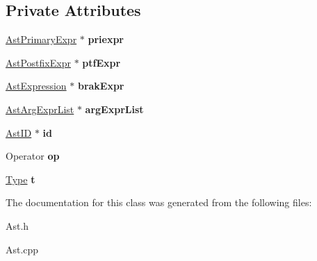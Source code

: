 \subsection*{Private Attributes}
\begin{DoxyCompactItemize}
\item 
\hypertarget{classAstPostfixExpr_a48162e70f9ec77d6aab3f036108cb69c}{\hyperlink{classAstPrimaryExpr}{Ast\-Primary\-Expr} $\ast$ {\bfseries priexpr}}\label{classAstPostfixExpr_a48162e70f9ec77d6aab3f036108cb69c}

\item 
\hypertarget{classAstPostfixExpr_ab66f24ef993fdad57b201fdb13dc9dc7}{\hyperlink{classAstPostfixExpr}{Ast\-Postfix\-Expr} $\ast$ {\bfseries ptf\-Expr}}\label{classAstPostfixExpr_ab66f24ef993fdad57b201fdb13dc9dc7}

\item 
\hypertarget{classAstPostfixExpr_aad843b4fb1a8c89dfd252b9f91809d45}{\hyperlink{classAstExpression}{Ast\-Expression} $\ast$ {\bfseries brak\-Expr}}\label{classAstPostfixExpr_aad843b4fb1a8c89dfd252b9f91809d45}

\item 
\hypertarget{classAstPostfixExpr_a492571ab26e55c7820652a906751d1cb}{\hyperlink{classAstArgExprList}{Ast\-Arg\-Expr\-List} $\ast$ {\bfseries arg\-Expr\-List}}\label{classAstPostfixExpr_a492571ab26e55c7820652a906751d1cb}

\item 
\hypertarget{classAstPostfixExpr_a6351e5be3e4c99881240266a8dbe2838}{\hyperlink{classAstID}{Ast\-I\-D} $\ast$ {\bfseries id}}\label{classAstPostfixExpr_a6351e5be3e4c99881240266a8dbe2838}

\item 
\hypertarget{classAstPostfixExpr_a0fe57762bbd015e8926114828922b514}{Operator {\bfseries op}}\label{classAstPostfixExpr_a0fe57762bbd015e8926114828922b514}

\item 
\hypertarget{classAstPostfixExpr_ab5db75237e4c895431464db149bd287b}{\hyperlink{classType}{Type} {\bfseries t}}\label{classAstPostfixExpr_ab5db75237e4c895431464db149bd287b}

\end{DoxyCompactItemize}


The documentation for this class was generated from the following files\-:\begin{DoxyCompactItemize}
\item 
Ast.\-h\item 
Ast.\-cpp\end{DoxyCompactItemize}
